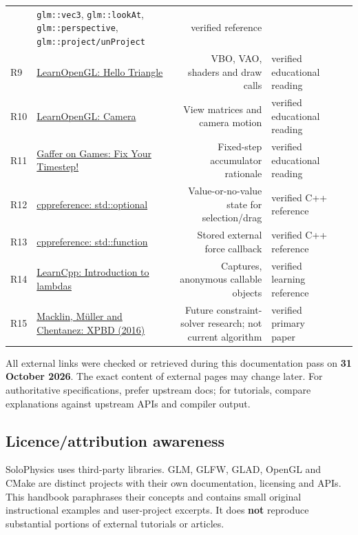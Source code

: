 \documentclass[
  10pt,
  a4paper,
]{article}
\begin{document}
\begin{longtable}[]
{Manual} & \texttt{glm::vec3}, \texttt{glm::lookAt},
\texttt{glm::perspective}, \texttt{glm::project/unProject} & verified
reference \\
R9 &
\href{https://learnopengl.com/Getting-started/Hello-Triangle}{LearnOpenGL:
Hello Triangle} & VBO, VAO, shaders and draw calls & verified
educational reading \\
R10 & \href{https://learnopengl.com/Getting-started/Camera}{LearnOpenGL:
Camera} & View matrices and camera motion & verified educational
reading \\
R11 & \href{https://gafferongames.com/post/fix_your_timestep/}{Gaffer on
Games: Fix Your Timestep!} & Fixed-step accumulator rationale & verified
educational reading \\
R12 &
\href{https://en.cppreference.com/cpp/utility/optional}{cppreference:
std::optional} & Value-or-no-value state for selection/drag & verified
C++ reference \\
R13 &
\href{https://en.cppreference.com/cpp/utility/functional/function}{cppreference:
std::function} & Stored external force callback & verified C++
reference \\
R14 &
\href{https://www.learncpp.com/cpp-tutorial/introduction-to-lambdas-anonymous-functions/}{LearnCpp:
Introduction to lambdas} & Captures, anonymous callable objects &
verified learning reference \\
R15 & \href{https://mmacklin.com/xpbd.pdf}{Macklin, Müller and
Chentanez: XPBD (2016)} & Future constraint-solver research; not current
algorithm & verified primary paper \\
\end{longtable}

All external links were checked or retrieved during this documentation
pass on \textbf{31 October 2026}. The exact content of external pages
may change later. For authoritative specifications, prefer upstream
docs; for tutorials, compare explanations against upstream APIs and
compiler output.

\subsection{Licence/attribution
awareness}\label{licenceattribution-awareness}

SoloPhysics uses third-party libraries. GLM, GLFW, GLAD, OpenGL and
CMake are distinct projects with their own documentation, licensing and
APIs. This handbook paraphrases their concepts and contains small
original instructional examples and user-project excerpts. It does
\textbf{not} reproduce substantial portions of external tutorials or
articles.
\end{document}
